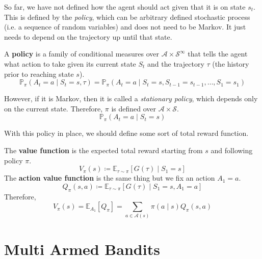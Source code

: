 \documentclass{article}
\begin{document}
  So far, we have not defined how the agent should act given that it is on state $s_t$. This is defined by the \textit{policy}, which can be arbitrary defined stochastic process (i.e. a sequence of random variables) and does not need to be Markov. It just needs to depend on the trajectory up until that state. 

  \begin{definition}[Policy]
    A \textbf{policy} is a family of conditional measures over $\mathcal{A} \times \mathcal{S}^\infty$ that tells the agent what action to take given its current state $S_t$ and the trajectory $\tau$ (the history prior to reaching state $s$).  
    \begin{equation}
      \mathbb{P}_\pi (A_t = a \mid S_t = s, \tau) = \mathbb{P}_{\pi} (A_t = a \mid S_t = s, S_{t-1} = s_{t-1}, \ldots, S_1 = s_1)
    \end{equation}
  \end{definition}

  \begin{definition}
    However, if it is Markov, then it is called a \textit{stationary policy}, which depends only on the current state. Therefore, $\pi$ is defined over $\mathcal{A} \times \mathcal{S}$. 
    \begin{equation}
      \mathbb{P}_\pi (A_t = a \mid S_t = s)
    \end{equation}
  \end{definition}

  With this policy in place, we should define some sort of total reward function. 

  \begin{definition}
    The \textbf{value function} is the expected total reward starting from $s$ and following policy $\pi$. 
    \begin{equation}
      V_\pi (s) \coloneqq \mathbb{E}_{\tau \sim \pi} [G(\tau) \mid S_1 = s]
    \end{equation}
    The \textbf{action value function} is the same thing but we fix an action $A_1 = a$. 
    \begin{equation}
      Q_{\pi} (s, a) \coloneqq \mathbb{E}_{\tau \sim \pi} [G(\tau) \mid S_1 = s, A_1 = a]
    \end{equation}
    Therefore, 
    \begin{equation}
      V_\pi (s) = \mathbb{E}_{A_1} [Q_\pi] = \sum_{a \in \mathcal{A}(s)} \pi(a \mid s) Q_\pi (s, a)
    \end{equation}
  \end{definition}

  

\section{Multi Armed Bandits}
\end{document}
